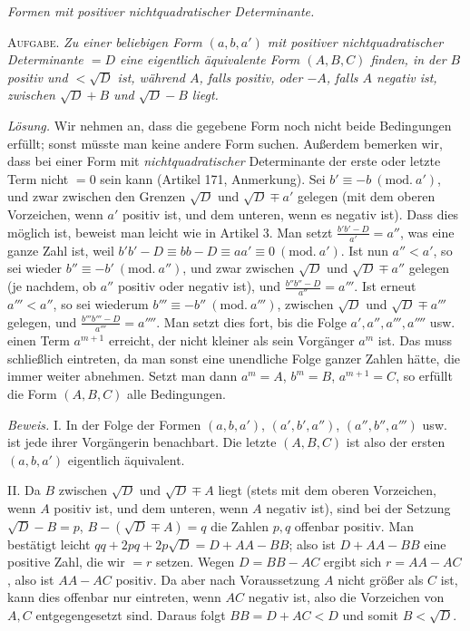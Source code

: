 \begin{center}
\textit{Formen mit positiver nichtquadratischer Determinante.}
\end{center}

\textsc{Aufgabe.} \textit{Zu einer beliebigen Form $(a,b,a')$ mit positiver nichtquadratischer Determinante $=D$ eine eigentlich äquivalente Form $(A,B,C)$ finden, in der $B$ positiv und $<\surd D$ ist, während $A$, falls positiv, oder $-A$, falls $A$ negativ ist, zwischen $\surd D+B$ und $\surd D-B$ liegt.}

\textit{Lösung.} Wir nehmen an, dass die gegebene Form noch nicht beide Bedingungen erfüllt; sonst müsste man keine andere Form suchen. Außerdem bemerken wir, dass bei einer Form mit \textit{nichtquadratischer} Determinante der erste oder letzte Term nicht $=0$ sein kann (Artikel 171, Anmerkung). Sei $b'\equiv-b\ (\mathrm{mod.}\ a')$, und zwar zwischen den Grenzen $\surd D$ und $\surd D\mp a'$ gelegen (mit dem oberen Vorzeichen, wenn $a'$ positiv ist, und dem unteren, wenn es negativ ist). Dass dies möglich ist, beweist man leicht wie in Artikel 3. Man setzt $\frac{b'b'-D}{a'}=a''$, was eine ganze Zahl ist, weil $b'b'-D\equiv bb-D\equiv aa'\equiv0\ (\mathrm{mod.}\ a')$. Ist nun $a''<a'$, so sei wieder $b''\equiv-b'\ (\mathrm{mod.}\ a'')$, und zwar zwischen $\surd D$ und $\surd D\mp a''$ gelegen (je nachdem, ob $a''$ positiv oder negativ ist), und $\frac{b''b''-D}{{a''}}=a'''$. Ist erneut $a'''<a''$, so sei wiederum $b'''\equiv-b''\ (\mathrm{mod.}\ a''')$, zwischen $\surd D$ und $\surd D\mp a'''$ gelegen, und $\frac{b'''b'''-D}{a'''}=a''''$. Man setzt dies fort, bis die Folge $a',a'',a''',a''''$ usw. einen Term $a^{m+1}$ erreicht, der nicht kleiner als sein Vorgänger $a^m$ ist. Das muss schließlich eintreten, da man sonst eine unendliche Folge ganzer Zahlen hätte, die immer weiter abnehmen. Setzt man dann $a^m=A$, $b^m=B$, $a^{m+1}=C$, so erfüllt die Form $(A,B,C)$ alle Bedingungen.

\textit{Beweis.} I. In der Folge der Formen $(a,b,a')$, $(a',b',a'')$, $(a'',b'',a''')$ usw. ist jede ihrer Vorgängerin benachbart. Die letzte $(A,B,C)$ ist also der ersten $(a,b,a')$ eigentlich äquivalent.

II. Da $B$ zwischen $\surd D$ und $\surd D\mp A$ liegt (stets mit dem oberen Vorzeichen, wenn $A$ positiv ist, und dem unteren, wenn $A$ negativ ist), sind bei der Setzung $\surd D-B=p$, $B-(\surd D\mp A)=q$ die Zahlen $p,q$ offenbar positiv. Man bestätigt leicht $qq+2pq+2p\surd D=D+AA-BB$; also ist $D+AA-BB$ eine positive Zahl, die wir $=r$ setzen. Wegen $D=BB-AC$
ergibt sich $r=AA-AC$, also ist $AA-AC$ positiv. Da aber nach Voraussetzung $A$ nicht größer als $C$ ist, kann dies offenbar nur eintreten, wenn $AC$ negativ ist, also die Vorzeichen von $A,C$ entgegengesetzt sind. Daraus folgt $BB=D+AC<D$ und somit $B<\surd D$.

